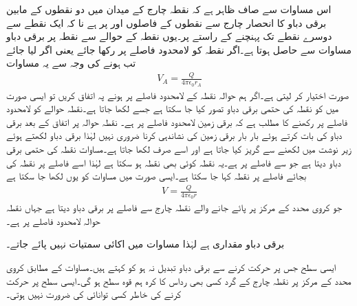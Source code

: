 اس مساوات سے صاف ظاہر ہے کہ نقطہ چارج  کے میدان میں دو نقطوں کے مابین برقی دباو کا انحصار چارج سے نقطوں کے فاصلوں  اور  پر ہے نا کہ ایک نقطے سے دوسرے نقطے تک پہنچنے کے راستے پر۔یوں نقطہ  کے حوالے سے نقطہ  پر برقی دباو مساوات  سے حاصل ہوتا ہے۔اگر نقطہ  کو لامحدود فاصلے پر رکھا جائے یعنی اگر  لیا جائے تب  ہونے کی وجہ سے  یہ مساوات
\begin{align}\label{مساوات_توانائی_نقطہ_چارج_کی_حتمی_دباو}
V_{A}=\frac{Q}{4\pi \epsilon_0 r_A}
\end{align}
صورت اختیار کر لیتی ہے۔اگر ہم  حوالہ نقطہ کے لامحدود فاصلے پر ہونے پہ اتفاق کریں تو ایسی صورت میں  کو نقطہ  کی حتمی برقی دباو تصور کیا جا سکتا ہے جسے  لکھا جاتا ہے۔نقطہ حوالے کو لامحدود فاصلے پر رکھنے کا مطلب ہے کہ برقی زمین لامحدود فاصلے پر ہے۔ نقطہ حوالہ پر اتفاق کے بعد برقی دباو کی بات کرتے ہوئے بار بار برقی زمین کی نشاندہی کرنا ضروری نہیں لہٰذا برقی دباو لکھتے ہوئے زیر نوشت میں  لکھنے سے گریز کیا جاتا ہے اور اسے صرف  لکھا جاتا ہے۔مساوات  نقطہ  کی حتمی برقی دباو دیتا ہے جو  سے  فاصلے پر ہے۔یہ نقطہ کوئی بھی نقطہ ہو سکتا ہے لہٰذا  اسے   فاصلے پر نقطہ  کی بجائے  فاصلے پر نقطہ کہا جا سکتا ہے۔ایسی صورت میں مساوات  کو یوں لکھا جا سکتا ہے
\begin{align}\label{مساوات_توانائی_نقطہ_چارج_کی_حتمی_دباو_الف}
V=\frac{Q}{4\pi \epsilon_0 r}
\end{align}
جو کروی محدد کے مرکز پر پائے جانے والے نقطہ چارج  سے  فاصلے پر برقی دباو  دیتا ہے جہاں نقطہ حوالہ لامحدود فاصلے پر ہے۔

برقی دباو مقداری ہے لہٰذا مساوات  میں اکائی سمتیات نہیں پائے جاتے۔

ایسی سطح جس پر حرکت کرنے سے برقی دباو تبدیل نہ ہو کو  کہتے ہیں۔مساوات  کے مطابق کروی محدد کے مرکز پر نقطہ چارج کے گرد کسی بھی رداس کا کرہ ہم قوہ سطح ہو گی۔ایسی سطح پر حرکت کرنے کی خاطر کسی توانائی کی ضرورت نہیں ہوتی۔

